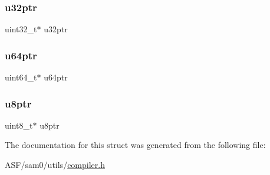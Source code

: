 \subsubsection{\texorpdfstring{u32ptr}{u32ptr}}
{\footnotesize\ttfamily uint32\+\_\+t$\ast$ u32ptr}

\mbox{\label{struct_struct_ptr_a01a7db75ae97caa7457038b8ee801d1f}} 
\subsubsection{\texorpdfstring{u64ptr}{u64ptr}}
{\footnotesize\ttfamily uint64\+\_\+t$\ast$ u64ptr}

\mbox{\label{struct_struct_ptr_acc04e057a962c975bbdf62664c52ff2c}} 
\subsubsection{\texorpdfstring{u8ptr}{u8ptr}}
{\footnotesize\ttfamily uint8\+\_\+t$\ast$ u8ptr}



The documentation for this struct was generated from the following file\+:\begin{DoxyCompactItemize}
\item 
A\+S\+F/sam0/utils/\mbox{\hyperlink{compiler_8h}{compiler.\+h}}\end{DoxyCompactItemize}
